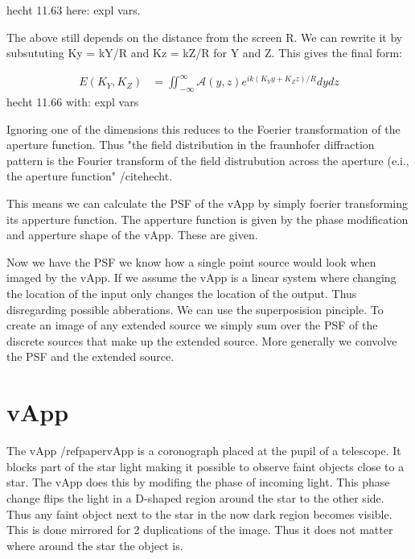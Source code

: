 hecht 11.63
here: expl vars.  

The above still depends on the distance from the screen R. We can rewrite it by subsututing Ky = kY/R and Kz = kZ/R for Y and Z. This gives the final form: 

\begin{subequations}
  \begin{align}
    E(K_Y,K_Z) &= \iint_{-\infty}^{\infty} \mathscr{A}(y,z) e^{ik(K_Yy+K_Zz)/R} dydz
  \end{align}
\end{subequations}
hecht 11.66
with: expl vars

Ignoring one of the dimensions this reduces to the Foerier transformation of the aperture function. Thus "the field distribution in the fraunhofer diffraction pattern is the Fourier transform of the field distrubution across the aperture (e.i., the aperture function" /cite{hecht}. 

This means we can calculate the PSF of the vApp by simply foerier transforming its apperture function. The apperture function is given by the phase modification and apperture shape of the vApp. These are given.

Now we have the PSF we know how a single point source would look when imaged by the vApp. If we assume the vApp is a linear system where changing the location of the input only changes the location of the output. Thus disregarding possible abberations. We can use the superposision pinciple. To create an image of any extended source we simply sum over the PSF of the discrete sources that make up the extended source. More generally we convolve the PSF and the extended source.






\section{vApp}

The vApp /ref{papervApp} is a coronograph placed at the pupil of a telescope. It blocks part of the star light making it possible to observe faint objects close to a star. The vApp does this by modifing the phase of incoming light. This phase change flips the light in a D-shaped region around the star to the other side. Thus any faint object next to the star in the now dark region becomes visible. This is done mirrored for 2 duplications of the image. Thus it does not matter where around the star the object is.


